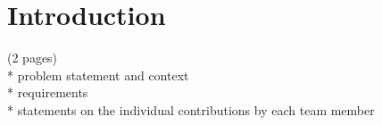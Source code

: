 \chapter{Introduction}

(2 pages)\\
* problem statement and context\\
* requirements\\
* statements on the individual contributions by each team member